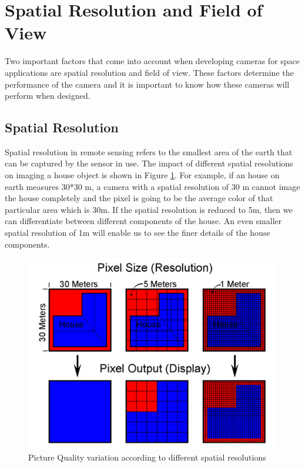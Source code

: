 \section{Spatial Resolution and Field of View}
Two important factors that come into account when developing cameras for space applications are spatial resolution and field of view. These factors determine the performance of the camera and it is important to know how these cameras will perform when designed.


\subsection{Spatial Resolution}
Spatial resolution in remote sensing refers to the smallest area of the earth that can be captured by the sensor in use. The impact of different spatial resolutions on imaging a house object is shown in Figure \ref{fig:spatial_resolution}. For example, if an house on earth measures 30*30 m, a camera with a spatial resolution of 30 m cannot image the house completely and the pixel is going to be the average color of that particular area which is 30m. If the spatial resolution is reduced to 5m, then we can differentiate between different components of the house. An even smaller spatial resolution of 1m will enable us to see the finer details of the house components. 

\begin{figure}[htb]
\includegraphics[width=\textwidth]{pics/spatial-resolution}
\caption{Picture Quality variation according to different spatial resolutions\cite{SpatialResol}}
\label{fig:spatial_resolution}
\end{figure}

